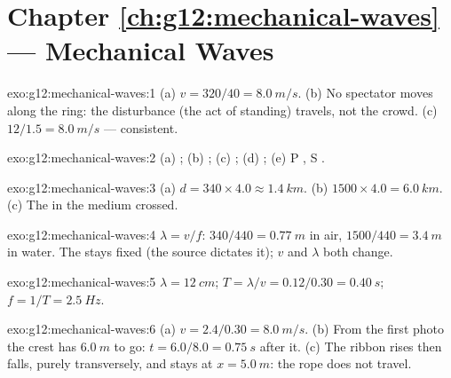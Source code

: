 \section*{Chapter \ref{ch:g12:mechanical-waves} --- Mechanical Waves}

\begin{solution}{exo:g12:mechanical-waves:1}
(a) $v = 320/40 = \qty{8.0}{m/s}$. (b) No spectator moves along the
ring: the disturbance (the act of standing) travels, not the crowd.
(c) $12/1.5 = \qty{8.0}{m/s}$ --- consistent.
\end{solution}

\begin{solution}{exo:g12:mechanical-waves:2}
(a) ; (b) ; (c) ; (d) ;
(e) P , S .
\end{solution}

\begin{solution}{exo:g12:mechanical-waves:3}
(a) $d = 340 \times 4.0 \approx \qty{1.4}{km}$.
(b) $1500 \times 4.0 = \qty{6.0}{km}$. (c) The  in
the medium crossed.
\end{solution}

\begin{solution}{exo:g12:mechanical-waves:4}
$\lambda = v/f$: $340/440 = \qty{0.77}{m}$ in air,
$1500/440 = \qty{3.4}{m}$ in water. The  stays fixed (the
source dictates it); $v$ and $\lambda$ both change.
\end{solution}

\begin{solution}{exo:g12:mechanical-waves:5}
$\lambda = \qty{12}{cm}$; $T = \lambda/v = 0.12/0.30 = \qty{0.40}{s}$;
$f = 1/T = \qty{2.5}{Hz}$.
\end{solution}

\begin{solution}{exo:g12:mechanical-waves:6}
(a) $v = 2.4/0.30 = \qty{8.0}{m/s}$. (b) From the first photo the
crest has $\qty{6.0}{m}$ to go: $t = 6.0/8.0 = \qty{0.75}{s}$ after
it. (c) The ribbon rises then falls, purely transversely, and stays
at $x = \qty{5.0}{m}$: the rope does not travel.
\end{solution}

